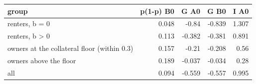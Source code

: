 \begin{tabular}{lrrrr}
\toprule
group & p(1-p) B0 & G A0 & G B0 & I A0 \\
\midrule
renters, b = 0 & 0.048 & -0.84 & -0.839 & 1.307 \\
renters, b > 0 & 0.113 & -0.382 & -0.381 & 0.891 \\
owners at the collateral floor (within 0.3) & 0.157 & -0.21 & -0.208 & 0.56 \\
owners above the floor & 0.189 & -0.037 & -0.034 & 0.28 \\
all & 0.094 & -0.559 & -0.557 & 0.995 \\
\bottomrule
\end{tabular}
